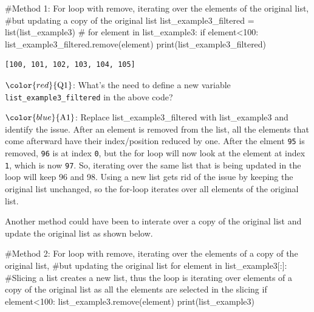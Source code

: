 \documentclass[
  letterpaper,
  DIV=11,
  numbers=noendperiod]{scrreprt}
\newenvironment{Shaded}{\begin{snugshade}}{\end{snugshade}}
\newcommand{\BuiltInTok}[1]{\textcolor[rgb]{0.00,0.23,0.31}{#1}}
\newcommand{\CommentTok}[1]{\textcolor[rgb]{0.37,0.37,0.37}{#1}}
\newcommand{\ControlFlowTok}[1]{\textcolor[rgb]{0.00,0.23,0.31}{#1}}
\newcommand{\DecValTok}[1]{\textcolor[rgb]{0.68,0.00,0.00}{#1}}
\newcommand{\KeywordTok}[1]{\textcolor[rgb]{0.00,0.23,0.31}{#1}}
\newcommand{\NormalTok}[1]{\textcolor[rgb]{0.00,0.23,0.31}{#1}}
\newcommand{\OperatorTok}[1]{\textcolor[rgb]{0.37,0.37,0.37}{#1}}
\begin{document}
\begin{Shaded}
\begin{Highlighting}[]
\CommentTok{\#Method 1: For loop with remove, iterating over the elements of the original list, }
\CommentTok{\#but updating a copy of the original list}
\NormalTok{list\_example3\_filtered }\OperatorTok{=} \BuiltInTok{list}\NormalTok{(list\_example3) }\CommentTok{\#}
\ControlFlowTok{for}\NormalTok{ element }\KeywordTok{in}\NormalTok{ list\_example3:}
    \ControlFlowTok{if}\NormalTok{ element}\OperatorTok{\textless{}}\DecValTok{100}\NormalTok{:}
\NormalTok{        list\_example3\_filtered.remove(element)}
\BuiltInTok{print}\NormalTok{(list\_example3\_filtered)}
\end{Highlighting}
\end{Shaded}

\begin{verbatim}
[100, 101, 102, 103, 104, 105]
\end{verbatim}

\(\color{red}{\text{Q1}}\): What's the need to define a new variable
\texttt{list\_example3\_filtered} in the above code?

\(\color{blue}{\text{A1}}\): Replace list\_example3\_filtered with
list\_example3 and identify the issue. After an element is removed from
the list, all the elements that come afterward have their index/position
reduced by one. After the elment \texttt{95} is removed, \texttt{96} is
at index \texttt{0}, but the for loop will now look at the element at
index \texttt{1}, which is now \texttt{97}. So, iterating over the same
list that is being updated in the loop will keep 96 and 98. Using a new
list gets rid of the issue by keeping the original list unchanged, so
the for-loop iterates over all elements of the original list.

Another method could have been to interate over a copy of the original
list and update the original list as shown below.

\begin{Shaded}
\begin{Highlighting}[]
\CommentTok{\#Method 2: For loop with remove, iterating over the elements of a copy of the original list, }
\CommentTok{\#but updating the original list}
\ControlFlowTok{for}\NormalTok{ element }\KeywordTok{in}\NormalTok{ list\_example3[:]: }\CommentTok{\#Slicing a list creates a new list, thus the loop is iterating over elements of a copy of the original list as all the elements are selected in the slicing}
    \ControlFlowTok{if}\NormalTok{ element}\OperatorTok{\textless{}}\DecValTok{100}\NormalTok{:}
\NormalTok{        list\_example3.remove(element)}
\BuiltInTok{print}\NormalTok{(list\_example3)}
\end{Highlighting}
\end{Shaded}
\end{document}
